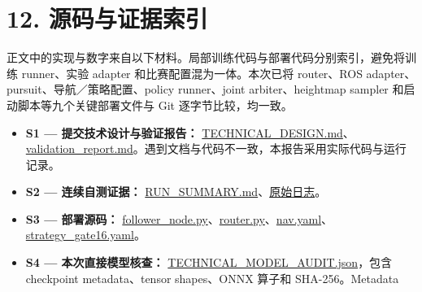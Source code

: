 \documentclass[
  10pt,
  a4paper,
]{article}
\providecommand{\tightlist}{%
  \setlength{\itemsep}{0pt}\setlength{\parskip}{0pt}}
\begin{document}
\clearpage

\section{12.
源码与证据索引}\label{ux6e90ux7801ux4e0eux8bc1ux636eux7d22ux5f15}

正文中的实现与数字来自以下材料。局部训练代码与部署代码分别索引，避免将训练
runner、实验 adapter 和比赛配置混为一体。本次已将 router、ROS
adapter、pursuit、导航／策略配置、policy runner、joint
arbiter、heightmap sampler 和启动脚本等九个关键部署文件与 Git
{\ttfamily\small{}} 逐字节比较，均一致。

\begin{itemize}
\tightlist
\item
  \textbf{S1 --- 提交技术设计与验证报告：}
  \href{<workspace-legacy>/resources/submission_update_20260820_392s/submission_20260820_392s_main3660b81/03_documents/TECHNICAL_DESIGN.md}{TECHNICAL\_DESIGN.md}、\href{<workspace-legacy>/resources/submission_update_20260820_392s/submission_20260820_392s_main3660b81/04_evidence/validation_report.md}{validation\_report.md}。遇到文档与代码不一致，本报告采用实际代码与运行记录。
\item
  \textbf{S2 --- 连续自测证据：}
  \href{<workspace-legacy>/resources/submission_update_20260820_392s/submission_20260820_392s_main3660b81/04_evidence/RUN_SUMMARY.md}{RUN\_SUMMARY.md}、\href{<workspace-legacy>/resources/submission_update_20260820_392s/submission_20260820_392s_main3660b81/04_evidence/raw/00_32_seed8.log}{原始日志}。
\item
  \textbf{S3 --- 部署源码：}
  \href{<workspace-legacy>/resources/submission_mac_retest_20260820/20260820_215224_main3660b81/source/goai26-s10-racing/src/s10_auto_nav/s10_auto_nav/follower_node.py}{follower\_node.py}、\href{<workspace-legacy>/resources/submission_mac_retest_20260820/20260820_215224_main3660b81/source/goai26-s10-racing/src/s10_auto_nav/s10_auto_nav/strategy/router.py}{router.py}、\href{<workspace-legacy>/resources/submission_mac_retest_20260820/20260820_215224_main3660b81/source/goai26-s10-racing/src/s10_bringup/config/nav.yaml}{nav.yaml}、\href{<workspace-legacy>/resources/submission_mac_retest_20260820/20260820_215224_main3660b81/source/goai26-s10-racing/src/s10_bringup/config/strategy_gate16.yaml}{strategy\_gate16.yaml}。
\item
  \textbf{S4 --- 本次直接模型核查：}
  \href{<workspace>/TECHNICAL_MODEL_AUDIT.json}{TECHNICAL\_MODEL\_AUDIT.json}，包含
  checkpoint metadata、tensor shapes、ONNX 算子和 SHA-256。Metadata

\end{itemize}
\end{document}
